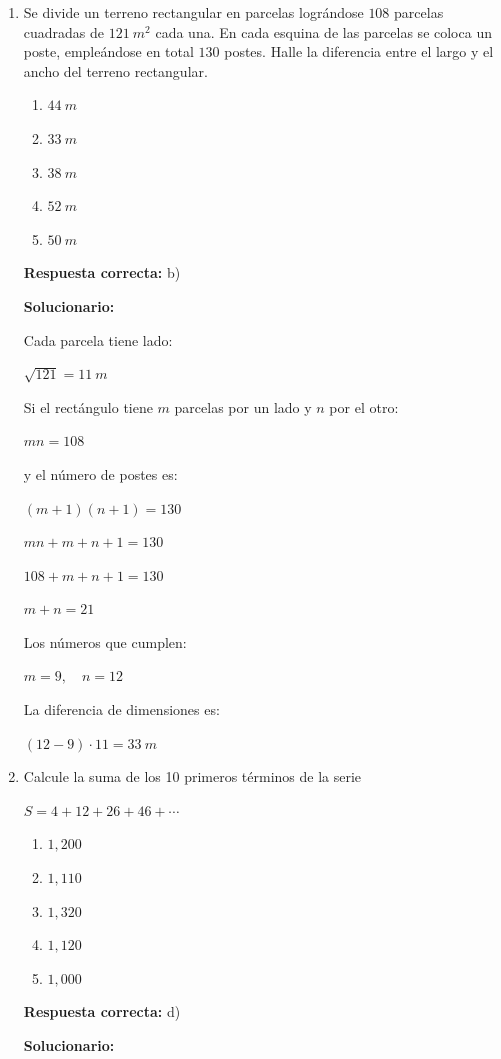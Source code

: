 \begin{enumerate}[resume]
	\item Se divide un terreno rectangular en parcelas lográndose $108$ parcelas cuadradas de $121\ m^2$ cada una. En cada esquina de las parcelas se coloca un poste, empleándose en total $130$ postes. Halle la diferencia entre el largo y el ancho del terreno rectangular.
	\begin{enumerate}[label=\alph*)]
		\item $44\ m$
		\item $33\ m$
		\item $38\ m$
		\item $52\ m$
		\item $50\ m$
	\end{enumerate}
	\textbf{Respuesta correcta:} b)
	
	\vspace{2mm}
	\textbf{Solucionario:}
	
	Cada parcela tiene lado:
	
	$\sqrt{121}=11\ m$
	
	Si el rectángulo tiene $m$ parcelas por un lado y $n$ por el otro:
	
	$mn=108$
	
	y el número de postes es:
	
	$(m+1)(n+1)=130$
	
	$mn+m+n+1=130$
	
	$108+m+n+1=130$
	
	$m+n=21$
	
	Los números que cumplen:
	
	$m=9,\quad n=12$
	
	La diferencia de dimensiones es:
	
	$(12-9)\cdot 11=33\ m$
	
	
	\vspace{6mm}
	
	\item Calcule la suma de los 10 primeros términos de la serie
	
	$S=4+12+26+46+\cdots$
	\begin{enumerate}[label=\alph*)]
		\item $1,200$
		\item $1,110$
		\item $1,320$
		\item $1,120$
		\item $1,000$
	\end{enumerate}
	\textbf{Respuesta correcta:} d)
	
	\vspace{2mm}
	\textbf{Solucionario:}
	

\end{enumerate}
